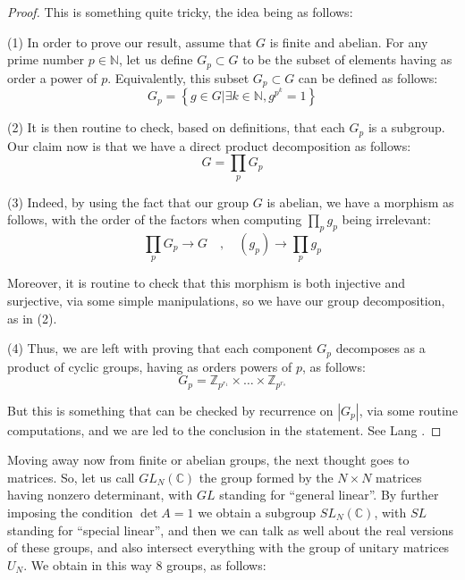 \documentclass[12pt]{amsbook}
\begin{document}
\begin{proof}
This is something quite tricky, the idea being as follows:

\medskip

(1) In order to prove our result, assume that $G$ is finite and abelian. For any prime number $p\in\mathbb N$, let us define $G_p\subset G$ to be the subset of elements having as order a power of $p$. Equivalently, this subset $G_p\subset G$ can be defined as follows:
$$G_p=\left\{g\in G\Big|\exists k\in\mathbb N,g^{p^k}=1\right\}$$

(2) It is then routine to check, based on definitions, that each $G_p$ is a subgroup. Our claim now is that we have a direct product decomposition as follows:
$$G=\prod_pG_p$$

(3) Indeed, by using the fact that our group $G$ is abelian, we have a morphism as follows, with the order of the factors when computing $\prod_pg_p$ being irrelevant:
$$\prod_pG_p\to G\quad,\quad (g_p)\to\prod_pg_p$$

Moreover, it is routine to check that this morphism is both injective and surjective, via some simple manipulations, so we have our group decomposition, as in (2).

\medskip

(4) Thus, we are left with proving that each component $G_p$ decomposes as a product of cyclic groups, having as orders powers of $p$, as follows:
$$G_p=\mathbb Z_{p^{r_1}}\times\ldots\times\mathbb Z_{p^{r_s}}$$

But this is something that can be checked by recurrence on $|G_p|$, via some routine computations, and we are led to the conclusion in the statement. See Lang \cite{lan}.
\end{proof}

Moving away now from finite or abelian groups, the next thought goes to matrices. So, let us call $GL_N(\mathbb C)$ the group formed by the $N\times N$ matrices having nonzero determinant, with $GL$ standing for ``general linear''. By further imposing the condition $\det A=1$ we obtain a subgroup $SL_N(\mathbb C)$, with $SL$ standing for ``special linear'', and then we can talk as well about the real versions of these groups, and also intersect everything with the group of unitary matrices $U_N$. We obtain in this way 8 groups, as follows:

\end{document}
